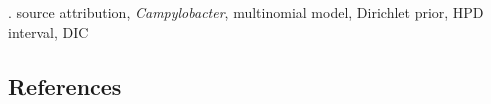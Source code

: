 \documentclass[12pt]{article}
\begin{document}
\vskip 2mm

.
source attribution, \textit{Campylobacter}, multinomial model, Dirichlet prior, HPD interval, DIC


%        
%
%        

\subsection*{References}
\end{document}
